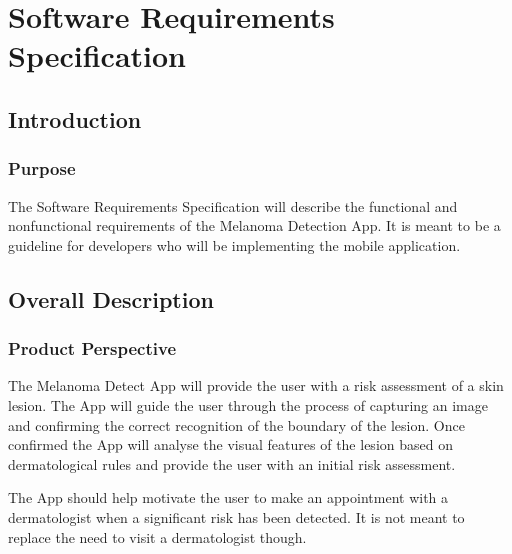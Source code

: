 \section{Software Requirements Specification}

    \subsection{Introduction}

        \subsubsection{Purpose}

            The Software Requirements Specification will describe the functional and nonfunctional requirements of the Melanoma Detection App. It is meant to be a guideline for developers who will be implementing the mobile application.

    \subsection{Overall Description}

        \subsubsection{Product Perspective}

            The Melanoma Detect App will provide the user with a risk assessment of a skin lesion. The App will guide the user through the process of capturing an image and confirming the correct recognition of the boundary of the lesion. Once confirmed the App will analyse the visual features of the lesion based on dermatological rules and provide the user with an initial risk assessment.

    The App should help motivate the user to make an appointment with a dermatologist when a significant risk has been detected. It is not meant to replace the need to visit a dermatologist though.


